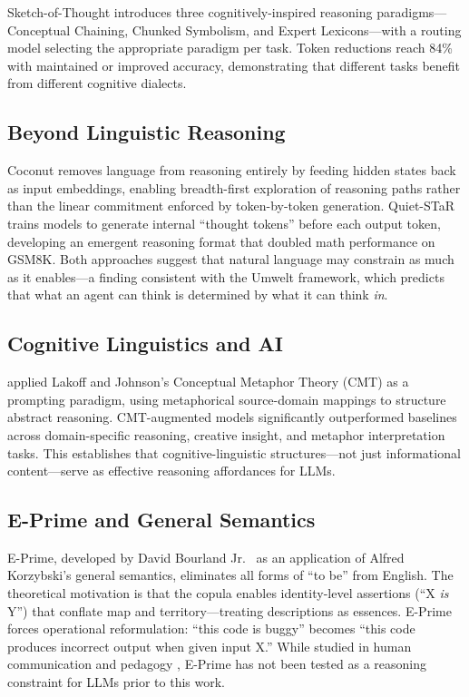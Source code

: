\documentclass[11pt,a4paper]{article}
\begin{document}
Sketch-of-Thought \citep{sketch2025} introduces three cognitively-inspired reasoning paradigms---Conceptual Chaining, Chunked Symbolism, and Expert Lexicons---with a routing model selecting the appropriate paradigm per task. Token reductions reach 84\% with maintained or improved accuracy, demonstrating that different tasks benefit from different cognitive dialects.

\subsection{Beyond Linguistic Reasoning}

Coconut \citep{hao2024} removes language from reasoning entirely by feeding hidden states back as input embeddings, enabling breadth-first exploration of reasoning paths rather than the linear commitment enforced by token-by-token generation. Quiet-STaR \citep{zelikman2024} trains models to generate internal ``thought tokens'' before each output token, developing an emergent reasoning format that doubled math performance on GSM8K. Both approaches suggest that natural language may constrain as much as it enables---a finding consistent with the Umwelt framework, which predicts that what an agent can think is determined by what it can think \emph{in}.

\subsection{Cognitive Linguistics and AI}

\citet{kramer2025} applied Lakoff and Johnson's Conceptual Metaphor Theory (CMT) as a prompting paradigm, using metaphorical source-domain mappings to structure abstract reasoning. CMT-augmented models significantly outperformed baselines across domain-specific reasoning, creative insight, and metaphor interpretation tasks. This establishes that cognitive-linguistic structures---not just informational content---serve as effective reasoning affordances for LLMs.

\subsection{E-Prime and General Semantics}

E-Prime, developed by David Bourland Jr.\ \citeyearpar{bourland1965} as an application of Alfred Korzybski's \citeyearpar{korzybski1933} general semantics, eliminates all forms of ``to be'' from English. The theoretical motivation is that the copula enables identity-level assertions (``X \emph{is} Y'') that conflate map and territory---treating descriptions as essences. E-Prime forces operational reformulation: ``this code is buggy'' becomes ``this code produces incorrect output when given input X.'' While studied in human communication and pedagogy \citep{bourland1991}, E-Prime has not been tested as a reasoning constraint for LLMs prior to this work.
\end{document}
